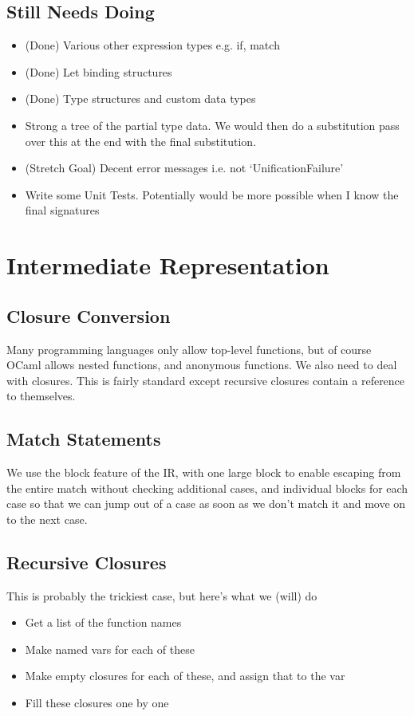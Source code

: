 \documentclass{report}
\begin{document}
\subsection{Still Needs Doing}
\begin{itemize}
	\item (Done) Various other expression types e.g. if, match
	\item (Done) Let binding structures
	\item (Done) Type structures and custom data types
	\item Strong a tree of the partial type data. We would then do a substitution pass over this at the end with the final substitution.
	\item (Stretch Goal) Decent error messages i.e. not `UnificationFailure'
	\item Write some Unit Tests. Potentially would be more possible when I know the final signatures
\end{itemize}

\section{Intermediate Representation}
\subsection{Closure Conversion}
Many programming languages only allow top-level functions, but of course OCaml allows nested functions, and anonymous functions. We also need to deal with closures. This is fairly standard except recursive closures contain a reference to themselves.

\subsection{Match Statements}
We use the block feature of the IR, with one large block to enable escaping from the entire match without checking additional cases, and individual blocks for each case so that we can jump out of a case as soon as we don't match it and move on to the next case.

\subsection{Recursive Closures}
This is probably the trickiest case, but here's what we (will) do
\begin{itemize}
	\item Get a list of the function names
	\item Make named vars for each of these
	\item Make empty closures for each of these, and assign that to the var
	\item Fill these closures one by one
\end{itemize}
\end{document}
